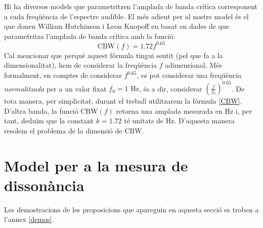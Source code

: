 \documentclass{article}
\theoremstyle{math}
\theoremstyle{TheoremNum}
\newcommand{\0}{\ensuremath{\vb{0}}}
\newcommand\Hz{\text{ Hz}}
\begin{document}
Hi ha diversos models que parametritzen l'amplada de banda crítica corresponent a cada freqüència de l'espectre audible. El més adient per al nostre model és el que donen William Hutchinson i Leon Knopoff en \cite{hutchinson} basat en dades de \cite{plomp,goodwin,mayer} que parametritza l'amplada de banda crítica amb la funció:
\begin{equation}
    \text{CBW}(f)=1.72 f^{0.65}
    \label{CBW}
\end{equation}
Cal mencionar que perquè aquest fórmula tingui sentit (pel que fa a la dimensionalitat), hem de considerar la freqüència $f$ adimensional. Més formalment, en comptes de considerar $f^{0.65}$, es pot considerar una freqüència \textit{normalitzada} per a un valor fixat $f_0=1\Hz$, és a dir, considerar ${\left(\frac{f}{f_0}\right)}^{0.65}$. De tota manera, per simplicitat, durant el treball utilitzarem la fórmula \eqref{CBW}. D'altra banda, la funció $\text{CBW}(f)$ retorna una amplada mesurada en Hz i, per tant, deduïm que la constant $k=1.72$ té unitats de Hz. D'aquesta manera resolem el problema de la dimensió de $\text{CBW}$.
\section{Model per a la mesura de dissonància}\label{model}
Les demostracions de les proposicions que apareguin en aquesta secció es troben a l'annex \ref{demos}.
\end{document}
